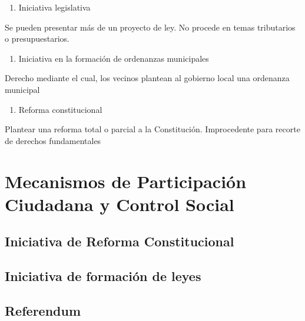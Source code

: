 \documentclass[
]{book}
\providecommand{\tightlist}{%
  \setlength{\itemsep}{0pt}\setlength{\parskip}{0pt}}
\begin{document}
\begin{enumerate}
\def\labelenumi{\arabic{enumi}.}
\setcounter{enumi}{2}
\tightlist
\item
  Iniciativa legislativa
\end{enumerate}

Se pueden presentar más de un proyecto de ley. No procede en temas tributarios o presupuestarios.

\begin{enumerate}
\def\labelenumi{\arabic{enumi}.}
\setcounter{enumi}{3}
\tightlist
\item
  Iniciativa en la formación de ordenanzas municipales
\end{enumerate}

Derecho mediante el cual, los vecinos plantean al gobierno local una ordenanza municipal

\begin{enumerate}
\def\labelenumi{\arabic{enumi}.}
\setcounter{enumi}{4}
\tightlist
\item
  Reforma constitucional
\end{enumerate}

Plantear una reforma total o parcial a la Constitución. Improcedente para recorte de derechos fundamentales

\hypertarget{mecanismos-de-participaciuxf3n-ciudadana-y-control-social}{%
\chapter{Mecanismos de Participación Ciudadana y Control Social}\label{mecanismos-de-participaciuxf3n-ciudadana-y-control-social}}

\hypertarget{iniciativa-de-reforma-constitucional}{%
\section{Iniciativa de Reforma Constitucional}\label{iniciativa-de-reforma-constitucional}}

\hypertarget{iniciativa-de-formaciuxf3n-de-leyes}{%
\section{Iniciativa de formación de leyes}\label{iniciativa-de-formaciuxf3n-de-leyes}}

\hypertarget{referendum}{%
\section{Referendum}\label{referendum}}
\end{document}

